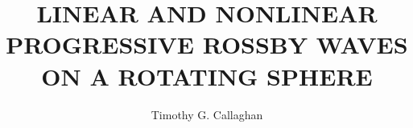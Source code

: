 
\titlepgtrue %
\signaturepagetrue %
\copyrighttrue %
\abswithesistrue %
\acktrue %
\tablecontentstrue %
\tablespagetrue %
\figurespagetrue %

\title{LINEAR AND NONLINEAR PROGRESSIVE ROSSBY WAVES ON A ROTATING SPHERE} %
\author{Timothy G. Callaghan} %


